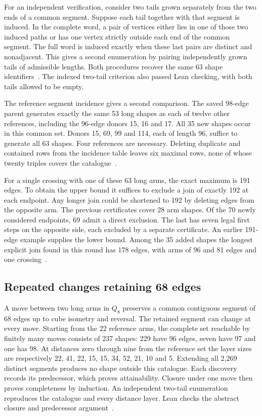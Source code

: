 \documentclass[11pt,a4paper]{article}
\theoremstyle{definition}
\theoremstyle{remark}
\begin{document}
For an independent verification, consider two tails grown separately
from the two ends of a common segment. Suppose each tail together
with that segment is induced. In the complete word, a pair of vertices
either lies in one of those two induced paths or has one vertex
strictly outside each end of the common segment. The full word is
induced exactly when these last pairs are distinct and nonadjacent.
This gives a second enumeration by pairing independently grown tails
of admissible lengths. Both procedures recover the same 63 shape
identifiers~\cite{short252}. The indexed two-tail criterion also passed Lean
checking, with both tails allowed to be empty.

The reference segment incidence gives a second comparison. The saved
98-edge parent generates exactly the same 53 long shapes as each of
twelve other references, including the 96-edge donors 15, 16 and 17.
All 35 new shapes occur in this common set. Donors 15, 69, 99 and
114, each of length 96, suffice to generate all 63 shapes. Four
references are necessary. Deleting duplicate and contained rows from
the incidence table leaves six maximal rows, none of whose twenty
triples covers the catalogue~\cite{short252}.

For a single crossing with one of these 63 long arms, the exact
maximum is 191 edges. To obtain the upper bound it suffices to
exclude a join of exactly 192 at each endpoint. Any longer join
could be shortened to 192 by deleting edges from the opposite arm.
The previous certificates cover 28 arm shapes. Of the 70 newly
considered endpoints, 69 admit a direct exclusion. The last has
seven legal first steps on the opposite side, each excluded by a
separate certificate. An earlier 191-edge example supplies the
lower bound. Among the 35 added shapes the longest explicit join
found in this round has 178 edges, with arms of 96 and 81 edges
and one crossing~\cite{short252}.

\subsection{Repeated changes retaining 68 edges}\label{sec:repeat253}

A move between two long arms in $Q_8$ preserves a common contiguous
segment of 68 edges up to cube isometry and reversal. The retained
segment can change at every move. Starting from the 22 reference arms,
the complete set reachable by finitely many moves consists of 237 shapes:
229 have 96 edges, seven have 97 and one has 98. At distances zero
through nine from the reference set the layer sizes are respectively
22, 41, 22, 15, 15, 34, 52, 21, 10 and 5. Extending all 2,269 distinct
segments produces no shape outside this catalogue. Each discovery
records its predecessor, which proves attainability. Closure under
one move then proves completeness by induction. An independent two-tail
enumeration reproduces the catalogue and every distance layer.
Lean checks the abstract closure and predecessor argument~\cite{repeat253}.
\end{document}
